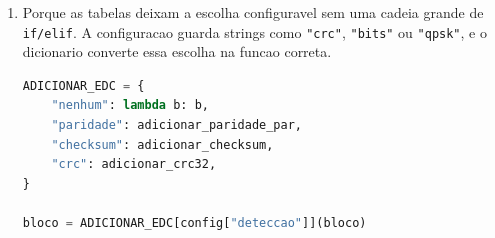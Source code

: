 \documentclass[12pt,a4paper]{article}
\begin{document}
\begin{enumerate}
  \item Porque as tabelas deixam a escolha configuravel sem uma cadeia grande de \texttt{if/elif}. A configuracao guarda strings como \texttt{"crc"}, \texttt{"bits"} ou \texttt{"qpsk"}, e o dicionario converte essa escolha na funcao correta.

  \begin{lstlisting}[language=Python]
ADICIONAR_EDC = {
    "nenhum": lambda b: b,
    "paridade": adicionar_paridade_par,
    "checksum": adicionar_checksum,
    "crc": adicionar_crc32,
}

bloco = ADICIONAR_EDC[config["deteccao"]](bloco)
  \end{lstlisting}
\end{enumerate}
\end{document}
